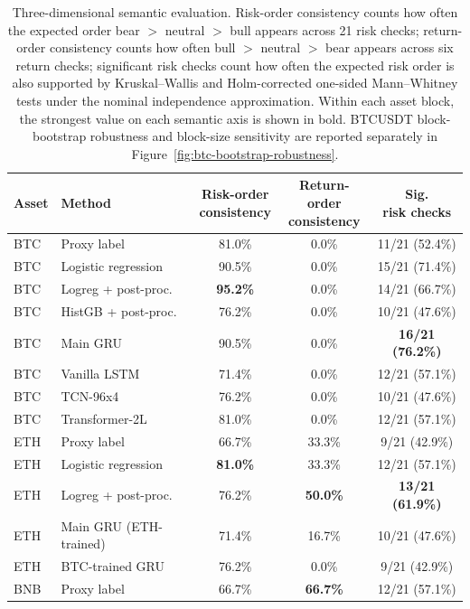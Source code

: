 \documentclass[a4paper,fleqn]{cas-dc}
\begin{document}
\begin{table}[t]
\caption{Three-dimensional semantic evaluation. Risk-order consistency counts how often the expected order bear $>$ neutral $>$ bull appears across 21 risk checks; return-order consistency counts how often bull $>$ neutral $>$ bear appears across six return checks; significant risk checks count how often the expected risk order is also supported by Kruskal--Wallis and Holm-corrected one-sided Mann--Whitney tests under the nominal independence approximation. Within each asset block, the strongest value on each semantic axis is shown in bold. BTCUSDT block-bootstrap robustness and block-size sensitivity are reported separately in Figure~\ref{fig:btc-bootstrap-robustness}.}
\label{tab:semantic-consistency}
\centering
\scriptsize
\setlength{\tabcolsep}{3pt}
\begin{tabular}{llccc}
\toprule
Asset & Method & \shortstack{Risk-order\\consistency} & \shortstack{Return-order\\consistency} & \shortstack{Sig.\\risk checks} \\
\midrule
BTC & Proxy label & 81.0\% & 0.0\% & 11/21 (52.4\%) \\
BTC & Logistic regression & 90.5\% & 0.0\% & 15/21 (71.4\%) \\
BTC & Logreg + post-proc. & \textbf{95.2\%} & 0.0\% & 14/21 (66.7\%) \\
BTC & HistGB + post-proc. & 76.2\% & 0.0\% & 10/21 (47.6\%) \\
BTC & Main GRU & 90.5\% & 0.0\% & \textbf{16/21 (76.2\%)} \\
BTC & Vanilla LSTM & 71.4\% & 0.0\% & 12/21 (57.1\%) \\
BTC & TCN-96x4 & 76.2\% & 0.0\% & 10/21 (47.6\%) \\
BTC & Transformer-2L & 81.0\% & 0.0\% & 12/21 (57.1\%) \\
\midrule
ETH & Proxy label & 66.7\% & 33.3\% & 9/21 (42.9\%) \\
ETH & Logistic regression & \textbf{81.0\%} & 33.3\% & 12/21 (57.1\%) \\
ETH & Logreg + post-proc. & 76.2\% & \textbf{50.0\%} & \textbf{13/21 (61.9\%)} \\
ETH & Main GRU (ETH-trained) & 71.4\% & 16.7\% & 10/21 (47.6\%) \\
ETH & BTC-trained GRU & 76.2\% & 0.0\% & 9/21 (42.9\%) \\
\midrule
BNB & Proxy label & 66.7\% & \textbf{66.7\%} & 12/21 (57.1\%) \\

\end{tabular}
\end{table}
\end{document}
